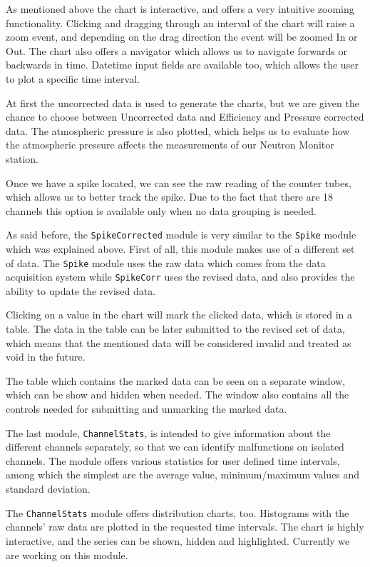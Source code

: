 \documentclass[a4paper]{jpconf}
\begin{document}
As mentioned above the chart is interactive, and offers a very intuitive
zooming functionality. Clicking and dragging through an interval of the chart will
raise a zoom event, and depending on the drag direction the event will be zoomed In
or Out. The chart also offers a navigator which allows us to navigate forwards or
backwards in time. Datetime input fields are available too, which allows the user to
plot a specific time interval.

At first the uncorrected data is used to generate the charts, but we are given
the chance to choose between Uncorrected data and Efficiency and Pressure corrected
data. The atmospheric pressure is also plotted, which helps us to evaluate how the
atmospheric pressure affects the measurements of our Neutron Monitor station.

Once we have a spike located, we can see the raw reading of the counter tubes,
which allows us to better track the spike. Due to the fact that there are 18
channels this option is available only when no data grouping is needed.

As said before, the \texttt{SpikeCorrected} module is very similar to the
\texttt{Spike} module which was explained above. First of all, this module makes
use of a different set of data. The \texttt{Spike} module uses the raw data which
comes from the data acquisition system while \texttt{SpikeCorr} uses the
revised data, and also provides the ability to update the revised data.

Clicking on a value in the chart will mark the clicked data, which is
stored in a table. The data in the table can be later submitted to the revised
set of data, which means that the mentioned data will be considered invalid and
treated as void in the future.

The table which contains the marked data can be seen on a separate window, which
can be show and hidden when needed. The window also contains all the
controls needed for submitting and unmarking the marked data.

The last module, \texttt{ChannelStats}, is intended to give information about the
different channels separately, so that we can identify malfunctions on isolated
channels. The module offers various statistics for user defined time intervals,
among which the simplest are the average value, minimum/maximum
values and standard deviation.

The \texttt{ChannelStats} module offers distribution charts, too. Histograms with the
channels' raw data are plotted in the requested time intervals. The chart is
highly interactive, and the series can be shown, hidden and highlighted. Currently
we are working on this module.
\end{document}
